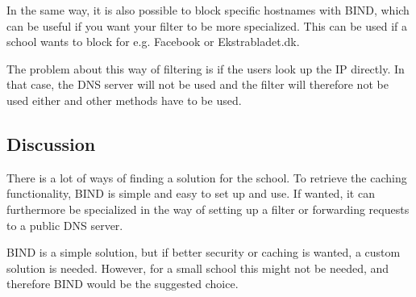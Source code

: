 \documentclass[Preamble]{subfiles}
\begin{document}
In the same way, it is also possible to block specific hostnames with BIND, which can be useful if you want your filter to be more specialized. 
This can be used if a school wants to block for e.g. Facebook or Ekstrabladet.dk.

The problem about this way of filtering is if the users look up the IP directly. 
In that case, the DNS server will not be used and the filter will therefore not be used either and other methods have to be used.


\subsection{Discussion}
There is a lot of ways of finding a solution for the school. 
To retrieve the caching functionality, BIND is simple and easy to set up and use. 
If wanted, it can furthermore be specialized in the way of setting up a filter or forwarding requests to a public DNS server.  

BIND is a simple solution, but if better security or caching is wanted, a custom solution is needed. However, for a small school this might not be needed, and therefore BIND would be the suggested choice.
\end{document}
